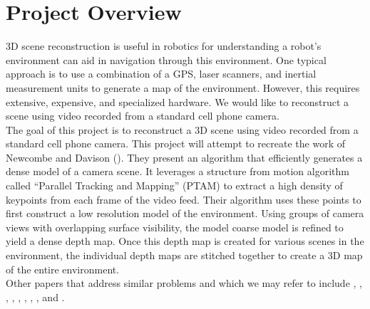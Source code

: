 \section{Project Overview}

3D scene reconstruction is useful in robotics for understanding a robot's environment can aid in navigation through this environment. One typical approach is to use a combination of a GPS, laser scanners, and inertial measurement units to generate a map of the environment. However, this requires extensive, expensive, and specialized hardware. We would like to reconstruct a scene using video recorded from a standard cell phone camera. \\

The goal of this project is to reconstruct a 3D scene using video recorded from a standard cell phone camera. This project will attempt to recreate the work of Newcombe and Davison (\citep{newcombe2010live}). They present an algorithm that efficiently generates a dense model of a camera scene. It leverages a structure from motion algorithm called ``Parallel Tracking and Mapping'' (PTAM) to extract a high density of keypoints from each frame of the video feed. Their algorithm uses these points to first construct a low resolution model of the environment. Using groups of camera views with overlapping surface visibility, the model coarse model is refined to yield a dense depth map. Once this depth map is created for various scenes in the environment, the individual depth maps are stitched together to create a 3D map of the entire environment. \\

Other papers that address similar problems and which we may refer to include \citep{newcombe2010live}, \citep{davison2003real}, \citep{klein2007parallel}, \citep{pollefeys2008detailed}, \citep{kuhl2006monocular}, \citep{magree2014monocular}, \citep{geiger2011stereoscan}, \citep{mclauchlan2000batch}, and \citep{davison2007monoslam}.
